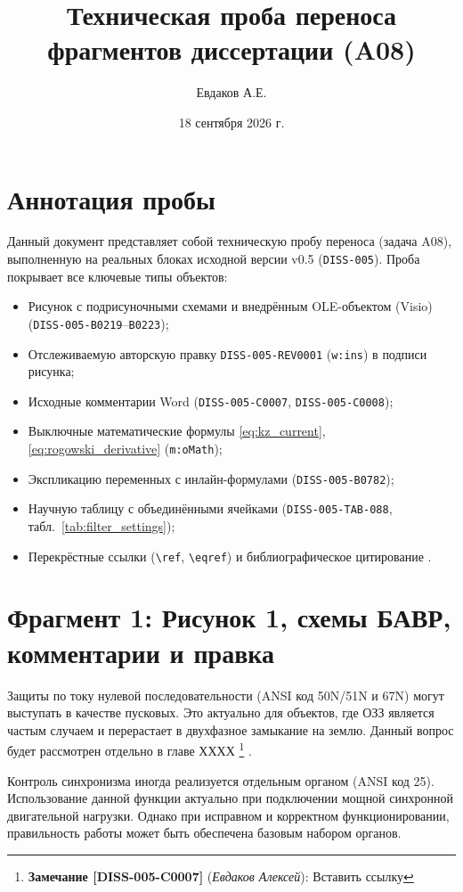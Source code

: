 \documentclass[12pt,a4paper]{article}
\title{Техническая проба переноса фрагментов диссертации (A08)}
\author{Евдаков А.Е.}
\date{18 сентября 2026 г.}
\DeclareRobustCommand{\commentnote}[3]{%
  \footnote{\textbf{Замечание [#1]} (\textit{#2}): #3}%
}
\begin{document}
\maketitle

\section*{Аннотация пробы}
Данный документ представляет собой техническую пробу переноса (задача A08), выполненную на реальных блоках исходной версии v0.5 (\texttt{DISS-005}). Проба покрывает все ключевые типы объектов:
\begin{itemize}
  \item Рисунок с подрисуночными схемами и внедрённым OLE-объектом (Visio) (\texttt{DISS-005-B0219}--\texttt{B0223});
  \item Отслеживаемую авторскую правку \texttt{DISS-005-REV0001} (\texttt{w:ins}) в подписи рисунка;
  \item Исходные комментарии Word (\texttt{DISS-005-C0007}, \texttt{DISS-005-C0008});
  \item Выключные математические формулы \eqref{eq:kz_current}, \eqref{eq:rogowski_derivative} (\texttt{m:oMath});
  \item Экспликацию переменных с инлайн-формулами (\texttt{DISS-005-B0782});
  \item Научную таблицу с объединёнными ячейками (\texttt{DISS-005-TAB-088}, табл.~\ref{tab:filter_settings});
  \item Перекрёстные ссылки (\texttt{\textbackslash ref}, \texttt{\textbackslash eqref}) и библиографическое цитирование \cite{yablokov2022}.
\end{itemize}

\section{Фрагмент 1: Рисунок 1, схемы БАВР, комментарии и правка}

Защиты по току нулевой последовательности (ANSI код 50N/51N и 67N) могут выступать в качестве пусковых. Это актуально для объектов, где ОЗЗ является частым случаем и перерастает в двухфазное замыкание на землю. Данный вопрос будет рассмотрен отдельно в главе ХХХХ\commentnote{DISS-005-C0007}{Евдаков Алексей}{Вставить ссылку}.

Контроль синхронизма иногда реализуется отдельным органом (ANSI код 25). Использование данной функции актуально при подключении мощной синхронной двигательной нагрузки. Однако при исправном и корректном функционировании, правильность работы может быть обеспечена базовым набором органов.
\end{document}
